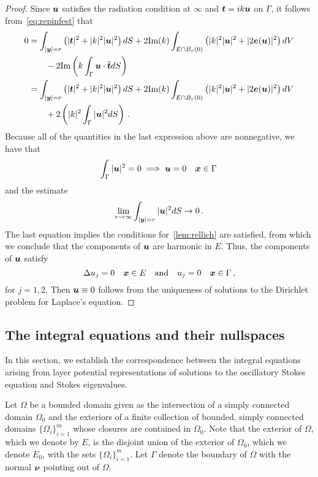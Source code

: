 \begin{proof}
Since ${\boldsymbol u}$ satisfies the radiation condition at $\infty$ and ${\boldsymbol t} = ik {\boldsymbol u}$
on $\Gamma$, it follows from~\cref{eq:repinfest} that
\begin{align*}
0 &=
\int_{|{\boldsymbol y}|=r} \left( |{\boldsymbol t}|^2 + |k|^2 |{\boldsymbol u}|^2 \right) dS +
2 \text{Im}(k) \int_{E \cap B_{r}(0)} \left(|k|^2 |{\boldsymbol u}|^2 + |2{\boldsymbol e}({\boldsymbol u})|^2 \right)
dV \nonumber \\
& \qquad - 2 \text{Im} \left( k \int_{\Gamma} {\boldsymbol u} \cdot \overline{{\boldsymbol t}} dS  \right) \\
&= 
\int_{|{\boldsymbol y}|=r} \left( |{\boldsymbol t}|^2 + |k|^2 |{\boldsymbol u}|^2 \right) dS +
2 \text{Im}(k) \int_{E \cap B_{r}(0)} \left(|k|^2 |{\boldsymbol u}|^2 + |2{\boldsymbol e}({\boldsymbol u})|^2 \right)
dV \nonumber \\
& \qquad + 2 \left( |k|^{2} \int_{\Gamma} |{\boldsymbol u}|^{2} dS  \right)
\, .
\end{align*}
Because all of the quantities in the last expression above are
nonnegative, we have that
\begin{equation}
  \int_{\Gamma} |{\boldsymbol u}|^{2} = 0 \implies {\boldsymbol u} = 0  \quad {\boldsymbol x} \in \Gamma \,
  \nonumber
\end{equation}
and the estimate
\begin{equation}
\lim_{r\to\infty} \int_{|{\boldsymbol y}|=r} |{\boldsymbol u}|^{2} dS \to 0 \, . \nonumber
\end{equation}
The last equation implies the conditions for~\cref{lem:rellich}
are satisfied, from which we conclude that the components
of ${\boldsymbol u}$ are harmonic in $E$. 
Thus, the components of ${\boldsymbol u}$ satisfy
\begin{equation}
\Delta u_{j}=  0 \quad {\boldsymbol x} \in E \quad \text{and} \quad
u_{j} = 0 \quad {\boldsymbol x} \in \Gamma \, , \nonumber
\end{equation}
for $j=1,2$.
Then ${\boldsymbol u} \equiv 0$ follows from the uniqueness of solutions to the 
Dirichlet problem for Laplace's equation.
\end{proof}

\subsection{The integral equations and their nullspaces}

In this section, we establish the correspondence between the
integral equations arising from layer potential representations
of solutions to the oscillatory Stokes equation and
Stokes eigenvalues.

Let $\Omega$ be a bounded domain given as
the intersection of a simply connected domain $\Omega_0$ and
the exteriors of a finite collection of bounded,
simply connected domains $\{ \Omega_i \}_{i=1}^m$
whose closures are contained in $\Omega_0$. Note that the
exterior of $\Omega$, which we denote by $E$, is the
disjoint union of the exterior of $\Omega_0$, which we
denote $E_0$, with the sets $\{ \Omega_i \}_{i=1}^m$.
Let $\Gamma$ denote the boundary of $\Omega$ with the normal
${\boldsymbol \nu}$ pointing out of $\Omega$.

